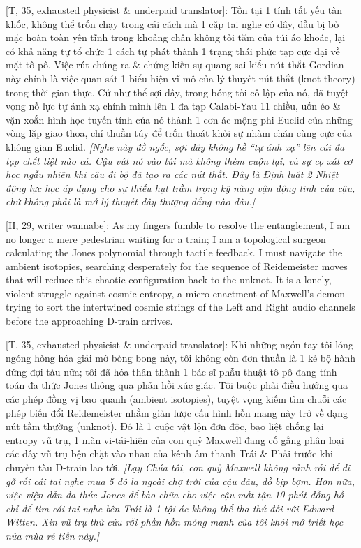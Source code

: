 \documentclass[11pt]{article}
\begin{document}
\textsf{[T, 35, exhausted physicist \& underpaid translator]:} Tồn tại 1 tính tất yếu tàn khốc, không thể trốn chạy trong cái cách mà 1 cặp tai nghe có dây, dẫu bị bỏ mặc hoàn toàn yên tĩnh trong khoảng chân không tối tăm của túi áo khoác, lại có khả năng tự tổ chức 1 cách tự phát thành 1 trạng thái phức tạp cực đại về mặt tô-pô. Việc rút chúng ra \& chứng kiến sự quang sai kiểu nút thắt Gordian này chính là việc quan sát 1 biểu hiện vĩ mô của lý thuyết nút thắt (knot theory) trong thời gian thực. Cứ như thể sợi dây, trong bóng tối cô lập của nó, đã tuyệt vọng nỗ lực tự ánh xạ chính mình lên 1 đa tạp Calabi-Yau 11 chiều, uốn éo \& vặn xoắn hình học tuyến tính của nó thành 1 cơn ác mộng phi Euclid của những vòng lặp giao thoa, chỉ thuần túy để trốn thoát khỏi sự nhàm chán cùng cực của không gian Euclid. \textit{[Nghe này đồ ngốc, sợi dây không hề ``tự ánh xạ'' lên cái đa tạp chết tiệt nào cả. Cậu vứt nó vào túi mà không thèm cuộn lại, và sự cọ xát cơ học ngẫu nhiên khi cậu đi bộ đã tạo ra các nút thắt. Đây là Định luật 2 Nhiệt động lực học áp dụng cho sự thiếu hụt trầm trọng kỹ năng vận động tinh của cậu, chứ không phải là mớ lý thuyết dây thượng đẳng nào đâu.]}

\vspace{2mm}
\textsf{[H, 29, writer wannabe]:} As my fingers fumble to resolve the entanglement, I am no longer a mere pedestrian waiting for a train; I am a topological surgeon calculating the Jones polynomial through tactile feedback. I must navigate the ambient isotopies, searching desperately for the sequence of Reidemeister moves that will reduce this chaotic configuration back to the unknot. It is a lonely, violent struggle against cosmic entropy, a micro-enactment of Maxwell’s demon trying to sort the intertwined cosmic strings of the Left and Right audio channels before the approaching D-train arrives.

\vspace{2mm}
\textsf{[T, 35, exhausted physicist \& underpaid translator]:} Khi những ngón tay tôi lóng ngóng hòng hóa giải mớ bòng bong này, tôi không còn đơn thuần là 1 kẻ bộ hành đứng đợi tàu nữa; tôi đã hóa thân thành 1 bác sĩ phẫu thuật tô-pô đang tính toán đa thức Jones thông qua phản hồi xúc giác. Tôi buộc phải điều hướng qua các phép đồng vị bao quanh (ambient isotopies), tuyệt vọng kiếm tìm chuỗi các phép biến đổi Reidemeister nhằm giản lược cấu hình hỗn mang này trở về dạng nút tầm thường (unknot). Đó là 1 cuộc vật lộn đơn độc, bạo liệt chống lại entropy vũ trụ, 1 màn vi-tái-hiện của con quỷ Maxwell đang cố gắng phân loại các dây vũ trụ bện chặt vào nhau của kênh âm thanh Trái \& Phải trước khi chuyến tàu D-train lao tới. \textit{[Lạy Chúa tôi, con quỷ Maxwell không rảnh rỗi để đi gỡ rối cái tai nghe mua 5 đô la ngoài chợ trời của cậu đâu, đồ bịp bợm. Hơn nữa, việc viện dẫn đa thức Jones để bào chữa cho việc cậu mất tận 10 phút đồng hồ chỉ để tìm cái tai nghe bên Trái là 1 tội ác không thể tha thứ đối với Edward Witten. Xin vũ trụ thử cứu rỗi phần hồn mỏng manh của tôi khỏi mớ triết học nửa mùa rẻ tiền này.]}
\end{document}
